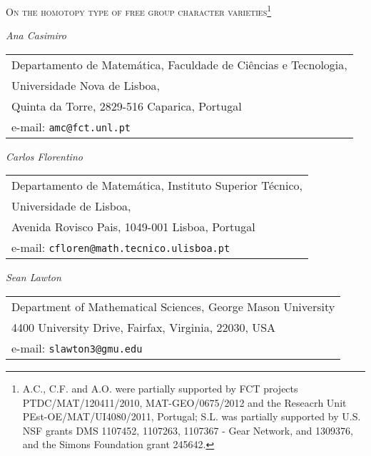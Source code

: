 \documentclass[a4paper,11pt,twoside]{article}
\newcounter{a}
\numberwithin{equation}{section}
\numberwithin{figure}{section}
\theoremstyle{plain}
\theoremstyle{definition}
\theoremstyle{remark}
\theoremstyle{plain}
\theoremstyle{plain}
\theoremstyle{plain}
\begin{document}
\thispagestyle{plain}

\begin{center}
\Large
\textsc{On the homotopy type of free group character varieties\footnote{A.C., C.F. and A.O. were partially supported by FCT projects PTDC/MAT/120411/2010, MAT-GEO/0675/2012 and the Reseacrh Unit PEst-OE/MAT/UI4080/2011, Portugal; S.L. was partially supported by  U.S. NSF grants DMS 1107452, 1107263, 1107367 - Gear Network, and 1309376, and the Simons Foundation grant 245642.}}
\end{center}

\begin{center}
\textit{Ana Casimiro} \smallskip \\
\begin{tabular}{l}
\small Departamento de Matem\'{a}tica, Faculdade de Ci\^{e}ncias e Tecnologia,\\
\small Universidade Nova de Lisboa, \\
\small Quinta da Torre,  2829-516 Caparica, Portugal       \\
\small e-mail: \texttt{amc@fct.unl.pt}   \\
\end{tabular}
\end{center}

\begin{center}
\textit{Carlos Florentino} \smallskip \\
\begin{tabular}{l}
\small Departamento de Matem\'{a}tica, Instituto Superior T\'{e}cnico,     \\
\small Universidade de Lisboa,                     \\
\small Avenida Rovisco Pais, 1049-001 Lisboa, Portugal       \\
\small e-mail: \texttt{cfloren@math.tecnico.ulisboa.pt}
\end{tabular}
\end{center}

\begin{center}
\textit{Sean Lawton} \smallskip \\
\begin{tabular}{l}
\small Department of Mathematical Sciences, George Mason University                  \\
\small 4400 University Drive, Fairfax, Virginia, 22030, USA       \\
\small e-mail: \texttt{slawton3@gmu.edu}
\end{tabular}
\end{center}
\end{document}

